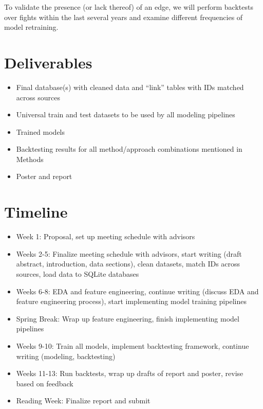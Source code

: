 \documentclass[
  letterpaper,
  DIV=11,
  numbers=noendperiod]{scrartcl}
\providecommand{\tightlist}{%
  \setlength{\itemsep}{0pt}\setlength{\parskip}{0pt}}\usepackage{longtable,booktabs,array}
\begin{document}
To validate the presence (or lack thereof) of an edge, we will perform backtests over fights within the last several years and examine different frequencies of model retraining.


\section{Deliverables}\label{deliverables}

\begin{itemize}
\tightlist
    \item Final database(s) with cleaned data and ``link'' tables with IDs matched across sources
    \item Universal train and test datasets to be used by all modeling pipelines
    \item Trained models
    \item Backtesting results for all method/approach combinations mentioned in Methods
    \item Poster and report
\end{itemize}


\section{Timeline}\label{timeline}

\begin{itemize}
\tightlist
    \item Week 1: Proposal, set up meeting schedule with advisors
    \item Weeks 2-5: Finalize meeting schedule with advisors, start writing (draft abstract, introduction, data sections), clean datasets, match IDs across sources, load data to SQLite databases
    \item Weeks 6-8: EDA and feature engineering, continue writing (discuss EDA and feature engineering process), start implementing model training pipelines
    \item Spring Break: Wrap up feature engineering, finish implementing model pipelines
    \item Weeks 9-10: Train all models, implement backtesting framework, continue writing (modeling, backtesting)
    \item Weeks 11-13: Run backtests, wrap up drafts of report and poster, revise based on feedback
    \item Reading Week: Finalize report and submit
\end{itemize}
\end{document}
